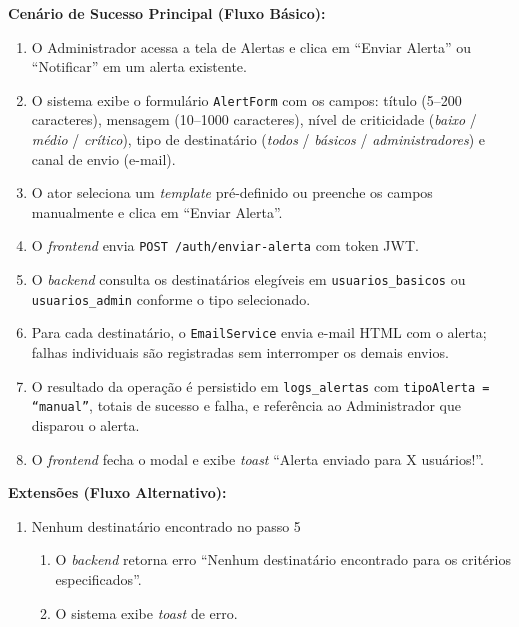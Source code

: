 \textbf{Cenário de Sucesso Principal (Fluxo Básico):}
\begin{enumerate}
  \item O Administrador acessa a tela de Alertas e clica
        em ``Enviar Alerta'' ou ``Notificar'' em um alerta
        existente.
  \item O sistema exibe o formulário \texttt{AlertForm}
        com os campos: título (5--200 caracteres), mensagem
        (10--1000 caracteres), nível de criticidade
        (\textit{baixo} / \textit{médio} /
        \textit{crítico}), tipo de destinatário
        (\textit{todos} / \textit{básicos} / \textit{administradores}) e canal de envio (e-mail).
  \item O ator seleciona um \textit{template} pré-definido
        ou preenche os campos manualmente e clica em
        ``Enviar Alerta''.
  \item O \textit{frontend} envia
        \texttt{POST /auth/enviar-alerta} com token JWT.
  \item O \textit{backend} consulta os destinatários
        elegíveis em \texttt{usuarios\_basicos} ou \\ \texttt{usuarios\_admin} conforme
        o tipo selecionado.
  \item Para cada destinatário, o \texttt{EmailService}
        envia e-mail HTML com o alerta; falhas individuais
        são registradas sem interromper os demais envios.
  \item O resultado da operação é persistido em \texttt{logs\_alertas}
        com \texttt{tipoAlerta = ``manual''}, totais de sucesso e
        falha, e referência ao Administrador que disparou o alerta.
  \item O \textit{frontend} fecha o modal e exibe
        \textit{toast} ``Alerta enviado para X usuários!''.
\end{enumerate}

\textbf{Extensões (Fluxo Alternativo):}

\begin{enumerate}
  \renewcommand{\theenumi}{5a}
  \renewcommand{\labelenumi}{\theenumi.}
  \item Nenhum destinatário encontrado no passo 5
  \begin{enumerate}
  \item O \textit{backend} retorna erro ``Nenhum
        destinatário encontrado para os critérios
        especificados''.
  \item O sistema exibe \textit{toast} de erro.
  \end{enumerate}
\end{enumerate}

